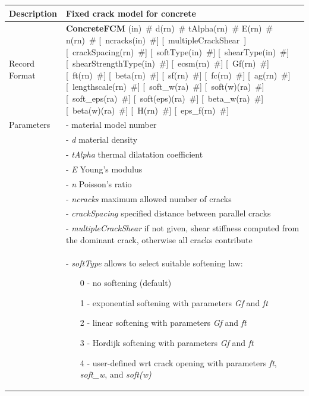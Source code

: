 \documentclass[a4paper]{article}
\newcommand{\descitem}[1]{{\noindent \bf #1}}
\newcommand{\elemparam}[2]{{{#1\tiny (#2)}~\#}}
\newcommand{\optelemparam}[2]{[{~\elemparam{#1}{#2}}]}
\newcommand{\elemstring}[1]{{#1}}
\newcommand{\optelemstring}[1]{[{~\elemstring{#1}~}]}
\newcommand{\param}[1]{{\it #1}}
\begin{document}
\begin{longtable}{|l|p{9cm}|}
\hline
Description & Fixed crack model for concrete\\
\hline
Record Format & \descitem{ConcreteFCM} 
\elemparam{}{in}
\elemparam{d}{rn} 
\elemparam{tAlpha}{rn}
\elemparam{E}{rn}
\elemparam{n}{rn}
\optelemparam{ncracks}{in}
\optelemstring{multipleCrackShear}
\optelemparam{crackSpacing}{rn}
\optelemparam{softType}{in}
\optelemparam{shearType}{in}
\optelemparam{shearStrengthType}{in}
\optelemparam{ecsm}{rn}
\optelemparam{Gf}{rn}
\optelemparam{ft}{rn} 
\optelemparam{beta}{rn} 
\optelemparam{sf}{rn} 
\optelemparam{fc}{rn} 
\optelemparam{ag}{rn} 
\optelemparam{lengthscale}{rn} 
\optelemparam{soft\_w}{ra} 
\optelemparam{soft(w)}{ra} 
\optelemparam{soft\_eps}{ra} 
\optelemparam{soft(eps)}{ra} 
\optelemparam{beta\_w}{ra} 
\optelemparam{beta(w)}{ra} 
\optelemparam{H}{rn} 
\optelemparam{eps\_f}{rn}
\\
Parameters &- \param{} material model number\\
&- \param{d} material density\\
&- \param{tAlpha} thermal dilatation coefficient\\
&- \param{E} Young's modulus\\
&- \param{n} Poisson's ratio\\
&- \param{ncracks} maximum allowed number of cracks\\
&- \param{crackSpacing} specified distance between parallel cracks\\
&- \param{multipleCrackShear} if not given, shear stiffness computed from the dominant crack, otherwise all cracks contribute\\
&- \param{softType} allows to select suitable softening law:
\begin{itemize}\setlength{\itemsep}{-3pt}
\item[0 -] no softening (default)
\item[1 -] exponential softening with parameters \param{Gf} and \param{ft}
\item[2 -] linear softening with parameters \param{Gf} and \param{ft}
\item[3 -] Hordijk softening with parameters \param{Gf} and \param{ft}
\item[4 -] user-defined wrt crack opening with parameters \param{ft}, \param{soft\_w}, and \param{soft(w)}

\end{itemize}
\end{longtable}
\end{document}

